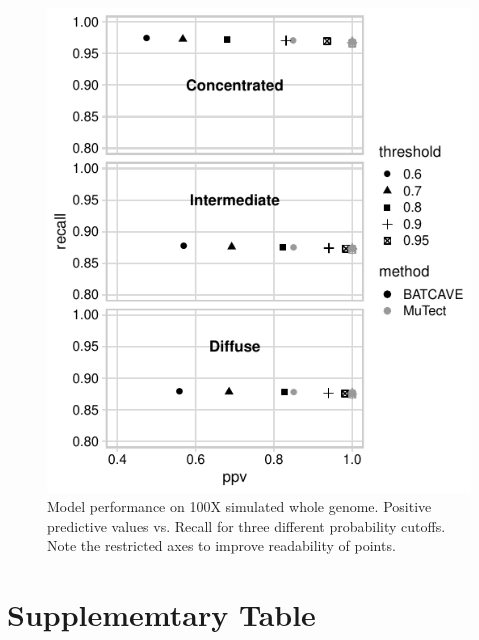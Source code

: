 \documentclass[a4,center,fleqn]{NAR}
\begin{document}
\clearpage
\begin{figure}
  \begin{center}
  \includegraphics{figures/ppv_wgs.pdf}
  \end{center}
  \caption{Model performance on 100X simulated whole genome. 
  Positive predictive values vs. Recall for three different probability cutoffs. 
  Note the restricted axes to improve readability of points.}
\label{NAR-ppv_wgs_fig}
\end{figure}

\section{Supplememtary Table}
\end{document}
